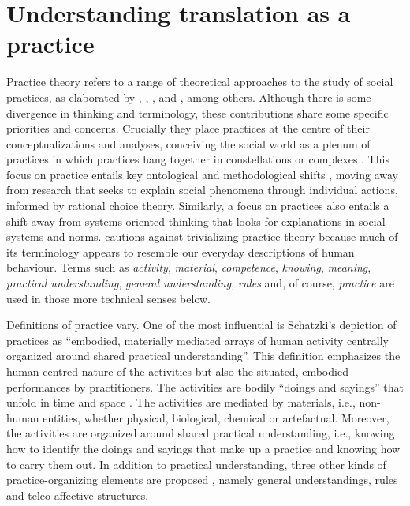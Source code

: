 \documentclass[output=paper,colorlinks,citecolor=brown]{langsci/langscibook}
\begin{document}
\section{Understanding translation as a practice}

Practice theory refers to a range of theoretical approaches to the study of social practices, as elaborated by \citet{schatzki_social_1996,schatzki_site_2002}, \citet{reckwitz_toward_2002}, \citet{shove_dynamics_2012}, \citet{nicolini_practice_2012} and \citet{warde_practice_2016}, among others. Although there is some divergence in thinking and terminology, these contributions share some specific priorities and concerns. Crucially they place practices at the centre of their conceptualizations and analyses, conceiving the social world as a plenum of practices in which practices hang together in constellations or complexes \citep{schatzki_practice_2016}. This focus on practice entails key ontological and methodological shifts \citep{brauchler_introduction_2010,reckwitz_toward_2002}, moving away from research that seeks to explain social phenomena through individual actions, informed by rational choice theory. Similarly, a focus on practices also entails a shift away from systems-oriented thinking that looks for explanations in social systems and norms. \citet[250]{reckwitz_toward_2002} cautions against trivializing practice theory because much of its terminology appears to resemble our everyday descriptions of human behaviour. Terms such as \textit{activity}, \textit{material}, \textit{competence}, \textit{knowing}, \textit{meaning}, \textit{practical understanding}, \textit{general understanding}, \textit{rules} and, of course, \textit{practice} are used in those more technical senses below.

Definitions of practice vary. One of the most influential is Schatzki's \citeyearpar[2]{schatzki_introduction:_2001} depiction of practices as \enquote{embodied, materially mediated arrays of human activity centrally organized around shared practical understanding}. This definition emphasizes the human-centred nature of the activities but also the situated, embodied performances by practitioners. The activities are bodily \enquote{doings and sayings} that unfold in time and space \citep[89]{schatzki_social_1996}. The activities are mediated by materials, i.e., non-human entities, whether physical, biological, chemical or artefactual. Moreover, the activities are organized around shared practical understanding, i.e., knowing how to identify the doings and sayings that make up a practice and knowing how to carry them out. In addition to practical understanding, three other kinds of practice-organizing elements are proposed \citep{schatzki_site_2002}, namely general understandings, rules and teleo-affective structures. 
\end{document}
